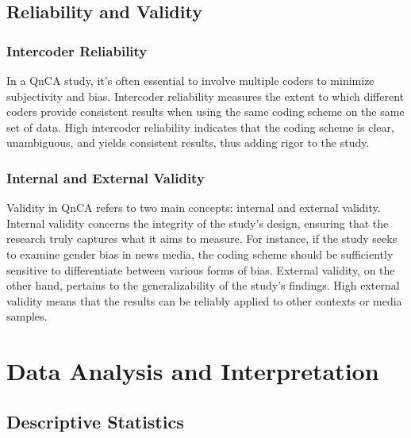 \documentclass[
  b5paper]{book}
\begin{document}
\hypertarget{reliability-and-validity}{%
\subsection{Reliability and Validity}\label{reliability-and-validity}}

\hypertarget{intercoder-reliability-1}{%
\subsubsection*{Intercoder Reliability}\label{intercoder-reliability-1}}

In a QnCA study, it's often essential to involve multiple coders to minimize subjectivity and bias. Intercoder reliability measures the extent to which different coders provide consistent results when using the same coding scheme on the same set of data. High intercoder reliability indicates that the coding scheme is clear, unambiguous, and yields consistent results, thus adding rigor to the study.

\hypertarget{internal-and-external-validity}{%
\subsubsection*{Internal and External Validity}\label{internal-and-external-validity}}

Validity in QnCA refers to two main concepts: internal and external validity. Internal validity concerns the integrity of the study's design, ensuring that the research truly captures what it aims to measure. For instance, if the study seeks to examine gender bias in news media, the coding scheme should be sufficiently sensitive to differentiate between various forms of bias. External validity, on the other hand, pertains to the generalizability of the study's findings. High external validity means that the results can be reliably applied to other contexts or media samples.

\hypertarget{data-analysis-and-interpretation}{%
\section{Data Analysis and Interpretation}\label{data-analysis-and-interpretation}}

\hypertarget{descriptive-statistics}{%
\subsection*{Descriptive Statistics}\label{descriptive-statistics}}
\end{document}
